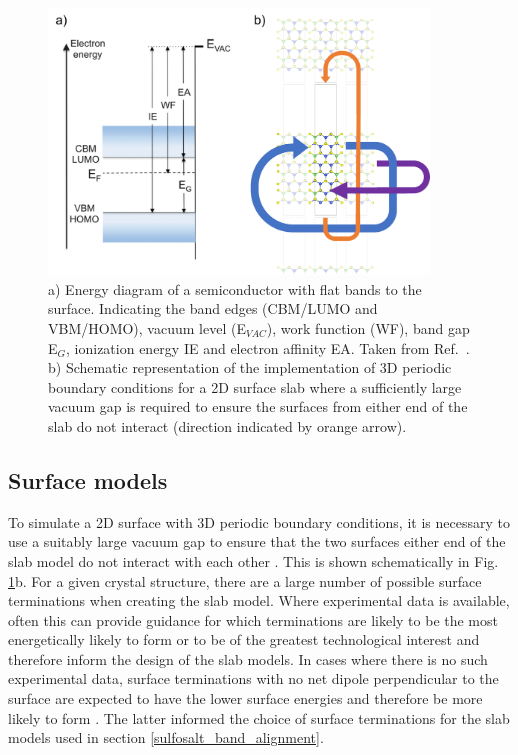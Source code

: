 \documentclass[11pt, twoside]{report}
\begin{document}
\begin{figure}[h!]
  \centering
    \includegraphics[width=0.9\textwidth]{figures/slab_figs.png}
    \caption[a) Energy diagram of a semiconductor with flat bands to the surface. Indicating the band edges (CBM/LUMO and VBM/HOMO), vacuum level (E$_{VAC}$), work function (WF), band gap E$_G$, ionization energy IE and electron affinity EA. b) Schematic representation of the implementation of 3D periodic boundary conditions for a 2D surface slab where a sufficiently large vacuum gap is required to ensure the surfaces from either end of the slab do not interact (direction indicated by orange arrow).]{a) Energy diagram of a semiconductor with flat bands to the surface. Indicating the band edges (CBM/LUMO and VBM/HOMO), vacuum level (E$_{VAC}$), work function (WF), band gap E$_G$, ionization energy IE and electron affinity EA. Taken from Ref.~. b) Schematic representation of the implementation of 3D periodic boundary conditions for a 2D surface slab where a sufficiently large vacuum gap is required to ensure the surfaces from either end of the slab do not interact (direction indicated by orange arrow).}
  \label{slabs}
\end{figure}

\subsection{Surface models}
To simulate a 2D surface with 3D periodic boundary conditions, it is necessary to use a suitably large vacuum gap to ensure that the two surfaces either end of the slab model do not interact with each other \cite{Prasad_ch6}. This is shown schematically in Fig. \ref{slabs}b.
For a given crystal structure, there are a large number of possible surface terminations when creating the slab model. Where experimental data is available, often this can provide guidance for which terminations are likely to be the most energetically likely to form or to be of the greatest technological interest and therefore inform the design of the slab models. In cases where there is no such experimental data, surface terminations with no net dipole perpendicular to the surface are expected to have the lower surface energies and therefore be more likely to form \cite{Tasker}. The latter informed the choice of surface terminations for the slab models used in section \ref{sulfosalt_band_alignment}.
\end{document}

